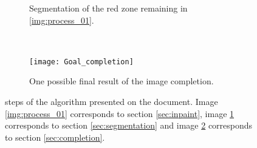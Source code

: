 \documentclass[10pt,a4paper]{llncs}
\begin{document}
\begin{figure}[b]
\begin{subfigure}[b]{0.3\textwidth}
	\caption{Segmentation of the red zone remaining in \ref{img:process_01}. }\label{img:process_02}
    \end{subfigure}
    ~ 
        \begin{subfigure}[b]{0.3\textwidth}
        \texttt{[image: Goal\_completion]}
	\caption{One possible final result of the image completion.}
	\label{img:process_03}
    \end{subfigure}
\caption{steps of the algorithm presented on the document. Image \ref{img:process_01} corresponds to section \ref{sec:inpaint}, image \ref{img:process_02} corresponds to section \ref{sec:segmentation} and  image \ref{img:process_03} corresponds to section \ref{sec:completion}.  }
\label{img:process}
\end{figure}





\end{document}
